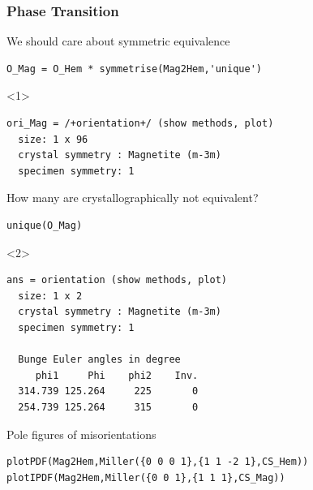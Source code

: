 \documentclass[compress]{beamer}
\begin{document}
\begin{frame}[fragile]
  \frametitle{Phase Transition}

    \begin{overlayarea}{\textwidth}{8cm}

  We should care about symmetric equivalence
  \begin{lstlisting}[style=input]
O_Mag = O_Hem * symmetrise(Mag2Hem,'unique')
  \end{lstlisting}
  \begin{onlyenv}<1>
    \vspace{-0.3cm}
    \begin{lstlisting}[style=output]
ori_Mag = /+orientation+/ (show methods, plot)
  size: 1 x 96
  crystal symmetry : Magnetite (m-3m)
  specimen symmetry: 1
    \end{lstlisting}
  \end{onlyenv}

  \pause

  How many are crystallographically not equivalent?
  \vspace{-0.2cm}
\begin{lstlisting}[style=input]
unique(O_Mag)
  \end{lstlisting}
  \begin{onlyenv}<2>
    \vspace{-0.3cm}
    \begin{lstlisting}[style=output]
ans = orientation (show methods, plot)
  size: 1 x 2
  crystal symmetry : Magnetite (m-3m)
  specimen symmetry: 1

  Bunge Euler angles in degree
     phi1     Phi    phi2    Inv.
  314.739 125.264     225       0
  254.739 125.264     315       0
    \end{lstlisting}
  \end{onlyenv}

\pause

Pole figures of misorientations

\vspace{-0.1cm}
\begin{lstlisting}[style=input]
plotPDF(Mag2Hem,Miller({0 0 0 1},{1 1 -2 1},CS_Hem))
plotIPDF(Mag2Hem,Miller({0 0 1},{1 1 1},CS_Mag))
\end{lstlisting}

\vspace{-0.3cm}


\end{overlayarea}
\end{frame}
\end{document}
